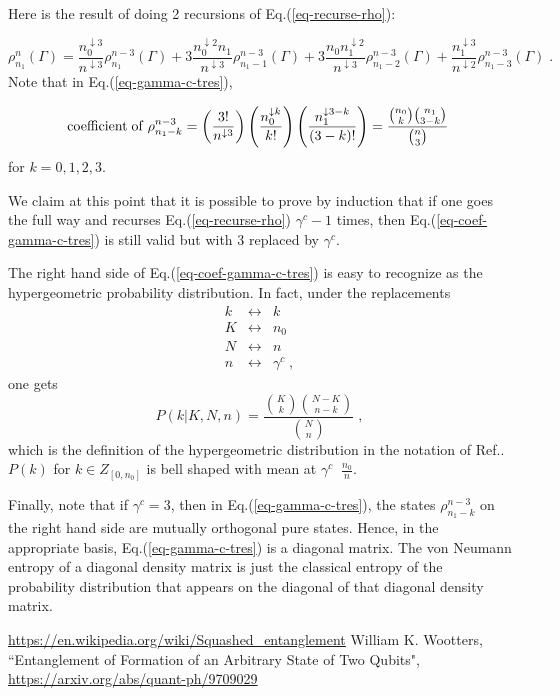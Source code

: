 \documentclass[12pt]{article}%
\newcommand{\beq}{\begin{equation}}
\newcommand{\eeq}{\end{equation}}
\newcommand{\beqa}{\begin{eqnarray}}
\newcommand{\eeqa}{\end{eqnarray}}
\newcommand{\darrow}[0]{{\downarrow}}
\begin{document}
{Here is the result of doing 2 recursions
of Eq.(\ref{eq-recurse-rho}):

\beq
\rho^{n}_{n_1}(\Gamma)=
\frac{n_0^{\darrow 3}}{n^{\darrow 3}}
\rho^{n-3}_{n_1}(\Gamma)
+
3\frac{n_0^{\darrow 2}n_1}{n^{\darrow 3}}
\rho^{n-3}_{n_1-1}(\Gamma)
+
3\frac{n_0 n_1^{\darrow 2}}{n^{\darrow 3}}
\rho^{n-3}_{n_1-2}(\Gamma)
+
\frac{n_1^{\darrow 3}}{n^{\darrow 2}}
\rho^{n-3}_{n_1-3}(\Gamma)
\;.
\label{eq-gamma-c-tres}
\eeq
Note that in Eq.(\ref{eq-gamma-c-tres}),

\beq
{\rm coefficient\;of\;}
\rho^{n-3}_{n_1-k} =
\left(\frac{3!}{n^{\darrow 3}}\right)
\left(\frac{n_0^{\darrow k}}{k!}\right)
\left(\frac{n_1^{\darrow 3-k}}{(3-k)!}\right)
=
\frac{{n_0\choose k}{n_1 \choose 3-k}}{{n\choose 3}}
\;
\label{eq-coef-gamma-c-tres}
\eeq
for $k=0,1,2,3$.

We claim at this point
that it is possible
to prove by induction
that if one goes the full way and recurses
Eq.(\ref{eq-recurse-rho}) $\gamma^c-1$
times, then
Eq.(\ref{eq-coef-gamma-c-tres})
is still valid but with
3 replaced by $\gamma^c$.

The right hand side of Eq.(\ref{eq-coef-gamma-c-tres})
is easy to recognize as the hypergeometric
probability distribution. In fact, under the
replacements
\beqa
k&\leftrightarrow&k
\\
K&\leftrightarrow&n_0
\\
N&\leftrightarrow&n
\\
n&\leftrightarrow&\gamma^c
\;,
\eeqa
one gets
\beq
P(k| K, N, n) =
\frac{{K\choose k}{N-K \choose n-k}}{{N\choose n}}
\;,
\eeq
which is the definition of the
hypergeometric distribution in
the notation of Ref.\cite{wiki-hypergeo}.
$P(k)$ for $k \in Z_{[0, n_0]}$
 is bell shaped with mean at $\gamma^c\;\;\frac{n_0}{n}$.

Finally, note that
if $\gamma^c=3$, then in Eq.(\ref{eq-gamma-c-tres}),
the states
$\rho^{n-3}_{n_1-k}$ on the right hand side are
mutually orthogonal pure states.
Hence, in the appropriate
basis,  Eq.(\ref{eq-gamma-c-tres})
is a diagonal matrix.
The von Neumann entropy of
a diagonal density matrix is
just
the classical entropy of
the probability distribution
that appears on the diagonal
of that diagonal density matrix.



\begin{thebibliography}{99}
\url{https://en.wikipedia.org/wiki/Squashed_entanglement}
William K. Wootters, 
``Entanglement of Formation of an Arbitrary State of Two Qubits",
\url{https://arxiv.org/abs/quant-ph/9709029}
 

\end{thebibliography}}
\end{document}
